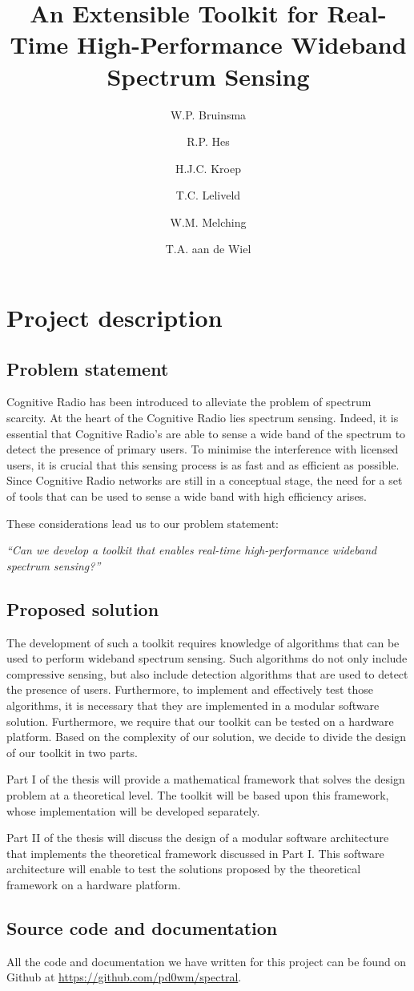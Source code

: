 \documentclass[a4paper, openany, oneside]{memoir}
\title{An Extensible Toolkit for Real-Time High-Performance Wideband Spectrum Sensing}
\author{W.P. Bruinsma \and R.P. Hes \and H.J.C. Kroep \and T.C. Leliveld \and W.M. Melching \and T.A. aan de Wiel}
\begin{document}
\chapter{Project description} \label{cha:problem_statement}
\section{Problem statement}

Cognitive Radio has been introduced to alleviate the problem of spectrum scarcity.
At the heart of the Cognitive Radio lies spectrum sensing. Indeed, it is essential that Cognitive Radio's are able to sense a wide band of the spectrum to detect the presence of primary users. To minimise the interference with licensed users, it is crucial that this sensing process is as fast and as efficient as possible. Since Cognitive Radio networks are still in a conceptual stage, the need for a set of tools that can be used to sense a wide band with high efficiency arises.

These considerations lead us to our problem statement:
\begin{center}
\emph{``Can we develop a toolkit that enables real-time high-performance wideband spectrum sensing?''}
\end{center}

\section{Proposed solution}
The development of such a toolkit requires knowledge of algorithms that can be used to perform wideband spectrum sensing. Such algorithms do not only include compressive sensing, but also include detection algorithms that are used to detect the presence of users. Furthermore, to implement and effectively test those algorithms, it is necessary that they are implemented in a modular software solution. Furthermore, we require that our toolkit can be tested on a hardware platform. Based on the complexity of our solution, we decide to divide the design of our toolkit in two parts.

Part I of the thesis will provide a mathematical framework that solves the design problem at a theoretical level. The toolkit will be based upon this framework, whose implementation will be developed separately.

Part II of the thesis will discuss the design of a modular software architecture that  implements the theoretical framework discussed in Part I. This software architecture will enable to test the solutions proposed by the theoretical framework on a hardware platform.

\section{Source code and documentation}
All the code and documentation we have written for this project can be found on Github at \url{https://github.com/pd0wm/spectral}.
\end{document}
